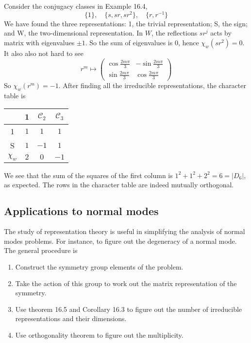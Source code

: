 \documentclass[a4paper]{article}
\begin{document}
\begin{eg}
  Consider the conjugacy classes in Example 16.4,
$$\{1\},\quad\{s, sr, sr^2\},\quad\{r, r^{-1}\}$$
We have found the three representations: 1, the trivial representation; S, the sign; and W, the two-dimensional representation. In $W$, the reflections $sr^j$ acts by matrix with eigenvalues $\pm 1$. So the sum of eigenvalues is $0$, hence $\chi_w(sr^2)= 0$. It also also not hard to see
$$r^m \mapsto
    \begin{pmatrix}
      \cos \frac{2m \pi}{3} & - \sin \frac{2m\pi}{3}\\
      \sin \frac{2m\pi}{3} & \cos \frac{2m \pi}{3}
    \end{pmatrix}$$
  So $\chi_w(r^m) = -1$. After finding all the irreducible representations, the character table is 
  \begin{center}
    \begin{tabular}{|c|c|c|c|}
      \hline
      & 1 & $\mathcal{C}_2$ & $\mathcal{C}_3$\\
      \hline
      1 & $1$ & $1$ & $1$\\
      S & $1$ & $-1$ & $1$\\
      $\chi_w$ & $2$ & $0$ & $-1$\\
      \hline
    \end{tabular}
  \end{center}
  We see that the sum of the squares of the first column is $1^2 + 1^2 + 2^2 = 6 = |D_6|$, as expected. The rows in the character table are indeed mutually orthogonal.
\end{eg}
\subsection{Applications to normal modes}
The study of representation theory is useful in simplifying the analysis of normal modes problems. For instance, to figure out the degeneracy of a normal mode. The general procedure is
\begin{enumerate}
    \item Construct the symmetry group elements of the problem.
    \item Take the action of this group to work out the matrix representation of the symmetry.
    \item Use theorem 16.5 and Corollary 16.3 to figure out the number of irreducible representations and their dimensions.
    \item Use orthogonality theorem to figure out the multiplicity.
\end{enumerate}
\end{document}
